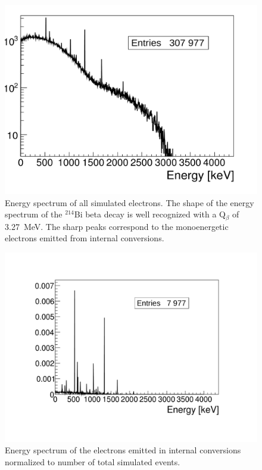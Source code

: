 \documentclass[main.tex]{subfiles}
\begin{document}
\begin{figure}[h!]
\begin{center}
\includegraphics[scale=0.32]{pictures/Chap5/energy_spectrum_all_electron.pdf}
\caption{Energy spectrum of all simulated electrons. The shape of the energy spectrum of the $^{214}$Bi beta decay is well recognized with a Q$_\beta$ of 3.27~MeV. The sharp peaks correspond to the monoenergetic electrons  emitted from internal conversions.}
\label{energyspectrumallelectron}
\end{center}
\end{figure}


\begin{figure}[h!]
\begin{center}
\includegraphics[scale=0.43]{pictures/Chap5/energy_spectrum_internal_conversion.pdf}
\caption{Energy spectrum of the electrons emitted in internal conversions normalized to number of total simulated events.}
\label{energyspectruminternalconversion}
\end{center}
\end{figure}
\end{document}
